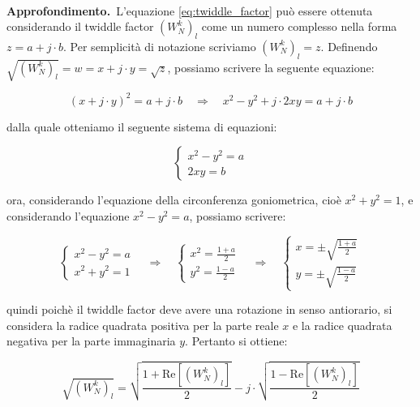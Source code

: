 \documentclass[a4paper,12pt]{report}  %
\newcommand{\namedparagraph}[2]{%
    \noindent\colorbox{cyan!20}{\parbox{\dimexpr\linewidth-2\fboxsep}{\textbf{#1}~#2}}%
}
\begin{document}
\noindent\\ \namedparagraph{Approfondimento.}{L'equazione \eqref{eq:twiddle_factor} può essere ottenuta considerando il twiddle factor $\left ( W_N^{k} \right )_l$ come un numero complesso nella forma $z = a + j \cdot b$.
Per semplicità di notazione scriviamo $\left ( W_N^{k} \right )_l = z$.
Definendo $\sqrt{\left ( W_N^{k} \right )_l} = w = x + j \cdot y = \sqrt{z}$, possiamo scrivere la seguente equazione:

\begin{equation}
    (x + j \cdot y)^2 = a + j \cdot b \quad \Longrightarrow \quad x^2 - y^2 + j \cdot 2xy = a + j \cdot b \nonumber
\end{equation}

dalla quale otteniamo il seguente sistema di equazioni:

\begin{equation}
    \begin{cases}
        x^2 - y^2 = a \\
        2xy = b
    \end{cases} \nonumber
\end{equation}

ora, considerando l'equazione della circonferenza goniometrica, cioè $x^2 + y^2 = 1$, e considerando l'equazione $x^2 - y^2 = a$, possiamo scrivere:

\begin{equation}
    \begin{cases}
        x^2 - y^2 = a \\
        x^2 + y^2 = 1
    \end{cases} \quad \Longrightarrow \quad
    \begin{cases}
        x^2 = \frac{1 + a}{2} \\
        y^2 = \frac{1 - a}{2}
    \end{cases} \quad \Longrightarrow \quad
    \begin{cases}
        x = \pm \sqrt{\frac{1 + a}{2}} \\
        y = \pm \sqrt{\frac{1 - a}{2}}
    \end{cases} \nonumber
\end{equation}

quindi poichè il twiddle factor deve avere una rotazione in senso antiorario, si considera la radice quadrata positiva per la parte reale $x$ e la radice quadrata negativa per la parte immaginaria $y$.
Pertanto si ottiene:

\begin{equation}
    \sqrt{\left ( W_N^{k} \right )_l} = \sqrt{\frac{1 + \text{Re}\left [ \left ( W_N^{k} \right )_l \right ]}{2}} - j \cdot \sqrt{\frac{1 - \text{Re}\left [ \left ( W_N^{k} \right )_l \right ]}{2}} \nonumber
\end{equation}
}
\end{document}
